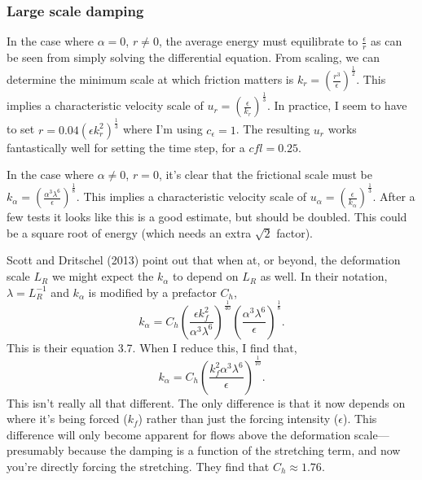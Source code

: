 \documentclass[11pt]{article}
\begin{document}
\subsubsection{Large scale damping}

In the case where $\alpha=0$, $r \neq 0$, the average energy must equilibrate to $\frac{\epsilon}{r}$ as can be seen from simply solving the differential equation. From scaling, we can determine the minimum scale at which friction matters is $k_r = \left( \frac{r^3}{\epsilon} \right)^{\frac{1}{2}}$. This implies a characteristic velocity scale of $u_r=\left(\frac{\epsilon}{k_r}\right)^\frac{1}{3}$. In practice, I seem to have to set $r = 0.04 \left( \epsilon k_r^2 \right)^{\frac{1}{3}}$ where I'm using $c_\epsilon=1$. The resulting $u_r$ works fantastically well for setting the time step, for a $cfl=0.25$.

In the case where $\alpha \neq 0$, $r = 0$, it's clear that the frictional scale must be $k_{\alpha}= \left( \frac{\alpha^3 \lambda^6}{\epsilon} \right)^{\frac{1}{8}}$. This implies a characteristic velocity scale of $u_\alpha=\left(\frac{\epsilon}{k_\alpha}\right)^\frac{1}{3}$. After a few tests it looks like this is a good estimate, but should be doubled. This could be a square root of energy (which needs an extra $\sqrt{2}$ factor).

Scott and Dritschel (2013) point out that when at, or beyond, the deformation scale $L_R$ we might expect the $k_\alpha$ to depend on $L_R$ as well. In their notation, $\lambda = L_R^{-1}$ and $k_\alpha$ is modified by a prefactor $C_h$,
\begin{equation}
k_{\alpha}= C_h \left( \frac{\epsilon k_f^2}{\alpha^3 \lambda^6} \right)^{\frac{1}{40}} \left( \frac{\alpha^3 \lambda^6}{\epsilon} \right)^{\frac{1}{8}}.
\end{equation}
This is their equation 3.7. When I reduce this, I find that,
\begin{equation}
k_{\alpha}= C_h \left( \frac{ k_f^2 \alpha^3 \lambda^6}{\epsilon} \right)^{\frac{1}{10}}.
\end{equation}
This isn't really all that different. The only difference is that it now depends on where it's being forced ($k_f$) rather than just the forcing intensity ($\epsilon$). This difference will only become apparent for flows above the deformation scale---presumably because the damping is a function of the stretching term, and now you're directly forcing the stretching. They find that $C_h\approx1.76$.
\end{document}
